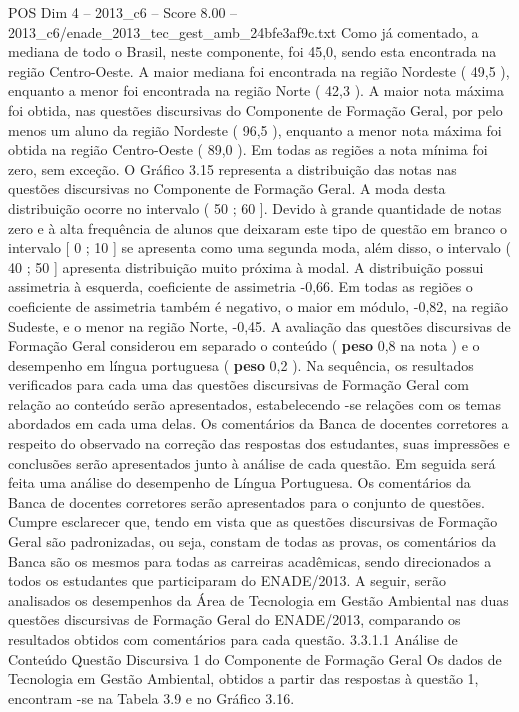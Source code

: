 \begin{textsample}{POS Dim 4 – 2013\_c6 – Score 8.00 – 2013\_c6/enade\_2013\_tec\_gest\_amb\_24bfe3af9c.txt}
Como já comentado, a mediana de todo o Brasil, neste componente, foi 45,0, sendo esta encontrada na região Centro-Oeste.
A maior mediana foi encontrada na região Nordeste ( 49,5 ), enquanto a menor foi encontrada na região Norte ( 42,3 ).
A maior nota máxima foi obtida, nas questões discursivas do Componente de Formação Geral, por pelo menos um aluno da região Nordeste ( 96,5 ), enquanto a menor nota máxima foi obtida na região Centro-Oeste ( 89,0 ).
Em todas as regiões a nota mínima foi zero, sem exceção.
O Gráfico 3.15 representa a distribuição das notas nas questões discursivas no Componente de Formação Geral.
A moda desta distribuição ocorre no intervalo ( 50 ; 60 ].
Devido à grande quantidade de notas zero e à alta frequência de alunos que deixaram este tipo de questão em branco o intervalo [ 0 ; 10 ] se apresenta como uma segunda moda, além disso, o intervalo ( 40 ; 50 ] apresenta distribuição muito próxima à modal.
A distribuição possui assimetria à esquerda, coeficiente de assimetria -0,66.
Em todas as regiões o coeficiente de assimetria também é negativo, o maior em módulo, -0,82, na região Sudeste, e o menor na região Norte, -0,45.
A avaliação das questões discursivas de Formação Geral considerou em separado o conteúdo ( \textbf{peso} 0,8 na nota ) e o desempenho em língua portuguesa ( \textbf{peso} 0,2 ).
Na sequência, os resultados verificados para cada uma das questões discursivas de Formação Geral com relação ao conteúdo serão apresentados, estabelecendo -se relações com os temas abordados em cada uma delas.
Os comentários da Banca de docentes corretores a respeito do observado na correção das respostas dos estudantes, suas impressões e conclusões serão apresentados junto à análise de cada questão.
Em seguida será feita uma análise do desempenho de Língua Portuguesa.
Os comentários da Banca de docentes corretores serão apresentados para o conjunto de questões.
Cumpre esclarecer que, tendo em vista que as questões discursivas de Formação Geral são padronizadas, ou seja, constam de todas as provas, os comentários da Banca são os mesmos para todas as carreiras acadêmicas, sendo direcionados a todos os estudantes que participaram do ENADE/2013.
A seguir, serão analisados os desempenhos da Área de Tecnologia em Gestão Ambiental nas duas questões discursivas de Formação Geral do ENADE/2013, comparando os resultados obtidos com comentários para cada questão. 3.3.1.1 Análise de Conteúdo Questão Discursiva 1 do Componente de Formação Geral Os dados de Tecnologia em Gestão Ambiental, obtidos a partir das respostas à questão 1, encontram -se na Tabela 3.9 e no Gráfico 3.16.

\end{textsample}
